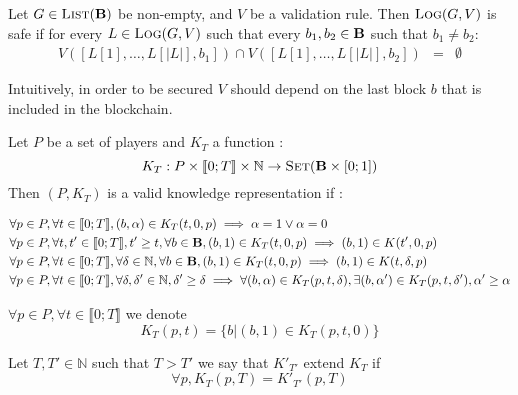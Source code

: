 \begin{mydef}
Let $G \in \text{\sc List}(\text{\bf B})$ be non-empty, and $V$ be a validation rule. Then $\text{\sc Log}(G,V)$ is safe if for every $L \in \text{\sc Log}(G,V)$ such that every $b_1, b_2 \in \text{\bf B}$ such that $b_1 \neq b_2$:
\begin{eqnarray*}
V([L[1], \ldots, L[|L|], b_1]) \cap V([L[1], \ldots, L[|L|], b_2]) & = & \emptyset
\end{eqnarray*}
\end{mydef}
Intuitively, in order to be secured $V$ should depend on the last block $b$ that is included in the blockchain.

\begin{mydef}
Let $P$ be a set of players and $K_T$ a function :
$$K_{T} : P \times \llbracket 0;T \rrbracket \times \mathbb{N} \rightarrow \text{\sc Set}(\text{\bf B} \times [0;1])$$ 
Then $(P,K_{T})$ is a valid knowledge representation if :

\begin{eqnarray*}
&\forall p \in P,\forall t\in \llbracket 0;T \rrbracket, (b,\alpha) \in K_{T}(t,0,p) \implies \alpha = 1 \lor \alpha = 0\\
&\forall p \in P,\forall t,t'\in \llbracket 0;T \rrbracket, t' \geq t, \forall b \in \text{\bf B},  (b,1) \in K_{T}(t,0,p) \implies (b,1) \in K(t',0,p)  \\
&\forall p \in P,\forall t\in \llbracket 0;T \rrbracket, \forall \delta \in \mathbb{N}, \forall b \in \text{\bf B},  (b,1) \in K_{T}(t,0,p) \implies (b,1) \in K(t,\delta,p) \\
&\forall p \in P,\forall t\in \llbracket 0;T \rrbracket, \forall \delta,\delta' \in \mathbb{N}, \delta' \geq \delta \implies \forall (b,\alpha) \in K_{T}(p,t,\delta), \exists (b,\alpha') \in K_{T}(p,t,\delta'), \alpha'\geq \alpha\\
\end{eqnarray*}
\end{mydef}

\begin{mynota}
	$\forall p \in P, \forall t\in \llbracket 0;T \rrbracket$ we denote $$K_{T}(p,t)=\{b | (b,1) \in K_{T}(p,t,0)\}$$
\end{mynota}

\begin{mydef}
	Let $T,T' \in \mathbb{N}$ such that $T>T'$ we say that $K'_{T'}$ extend $K_{T}$ if $$\forall p, K_{T}(p,T) = K'_{T'}(p,T)$$
\end{mydef}

